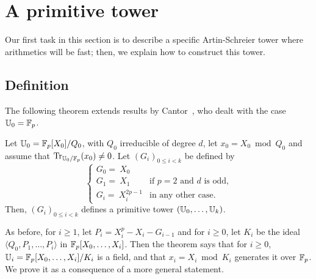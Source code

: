 \section{A primitive tower}
\label{sec:fast-tower}

Our first task in this section is to describe a specific
Artin-Schreier tower where arithmetics will be fast; then, we explain
how to construct this tower. 


\subsection{Definition}

The following theorem extends results by
Cantor~\cite[Theorem~1.2]{cantor89}, who dealt with the case
$\mathbb{U}_0=\mathbb{F}_p$.

\begin{theorem}
  \label{th:cantor}
  Let $\mathbb{U}_0=\mathbb{F}_p[X_0]/Q_0$, with $Q_0$ irreducible of
  degree $d$, let $x_0 = X_0 \bmod Q_0$ and assume that
  $\operatorname{Tr}_{\mathbb{U}_0/\mathbb{F}_p}(x_0)\ne0$. Let $(G_i)_{0 \le i <k}$ be defined by
$$ \begin{cases}
G_0 = ~X_0\\
G_1 = ~X_1        &\text{if $p=2$ and $d$ is odd,}\\
G_i = ~X_i^{2p-1} &\text{in any other case.}
\end{cases}$$
Then, $(G_i)_{0 \le i <k}$ defines a primitive tower $(\mathbb{U}_0,\dots,\mathbb{U}_k)$.
\end{theorem}

As before, for $i \ge 1$, let $P_i = X_i^p - X_i - G_{i-1}$ and for $i
\ge 0$, let $K_i$ be the ideal $\langle Q_0,P_1,\dots,P_i\rangle$ in
$\mathbb{F}_p[X_0,\dots,X_i]$.  Then the theorem says that for $i\ge 0$,
$\mathbb{U}_i=\mathbb{F}_p[X_0,\dots,X_i]/K_i$ is a field, and that $x_i=X_i \bmod
K_i$ generates it over $\mathbb{F}_p$.  We prove it as a consequence of a more
general statement.

